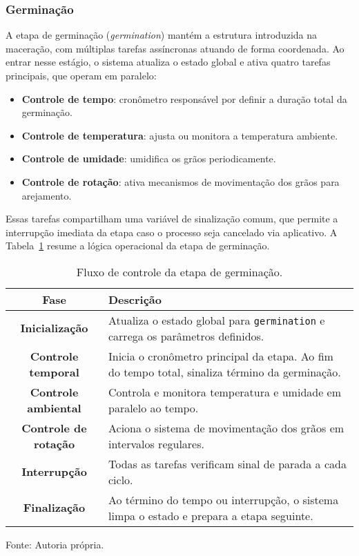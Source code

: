 \subsubsection{Germinação}

A etapa de germinação (\textit{germination}) mantém a estrutura introduzida na maceração, com múltiplas tarefas assíncronas atuando de forma coordenada. Ao entrar nesse estágio, o sistema atualiza o estado global e ativa quatro tarefas principais, que operam em paralelo:

\begin{itemize}
    \item \textbf{Controle de tempo}: cronômetro responsável por definir a duração total da germinação.
    \item \textbf{Controle de temperatura}: ajusta ou monitora a temperatura ambiente.
    \item \textbf{Controle de umidade}: umidifica os grãos periodicamente.
    \item \textbf{Controle de rotação}: ativa mecanismos de movimentação dos grãos para arejamento.
\end{itemize}

Essas tarefas compartilham uma variável de sinalização comum, que permite a interrupção imediata da etapa caso o processo seja cancelado via aplicativo. A Tabela~\ref{tab:germinacao_fluxo} resume a lógica operacional da etapa de germinação.

\begin{table}[H]
    \caption{Fluxo de controle da etapa de germinação.}
    \label{tab:germinacao_fluxo}
    \centering
    \begin{tabular}{>{\bfseries}c p{10cm}}
        \hline
        Fase & Descrição \\
        \hline
        Inicialização & Atualiza o estado global para \texttt{germination} e carrega os parâmetros definidos. \\
        Controle temporal & Inicia o cronômetro principal da etapa. Ao fim do tempo total, sinaliza término da germinação. \\
        Controle ambiental & Controla e monitora temperatura e umidade em paralelo ao tempo. \\
        Controle de rotação & Aciona o sistema de movimentação dos grãos em intervalos regulares. \\
        Interrupção & Todas as tarefas verificam sinal de parada a cada ciclo. \\
        Finalização & Ao término do tempo ou interrupção, o sistema limpa o estado e prepara a etapa seguinte. \\
        \hline
    \end{tabular}

    {\centering\footnotesize Fonte: Autoria própria.\par}
\end{table}


